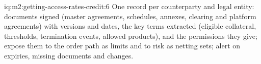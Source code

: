 \begin{solution}{iq:m2:getting-access-rates-credit:6}
One record per counterparty and legal entity: documents signed (master agreements,
schedules, annexes, clearing and platform agreements) with versions and dates, the key
terms extracted (eligible collateral, thresholds, termination events, allowed
products), and the permissions they give; expose them to the order path as limits and
to risk as netting sets; alert on expiries, missing documents and changes.
\end{solution}

